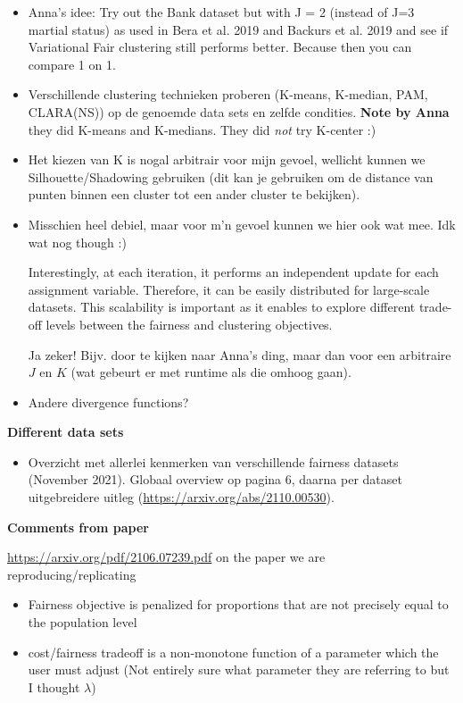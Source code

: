 \documentclass{article}
\begin{document}
\begin{itemize}
    \item Anna's idee: Try out the Bank dataset but with J = 2 (instead of J=3 martial status) as used in Bera et al. 2019 and Backurs et al. 2019 and see if Variational Fair clustering still performs better. Because then you can compare 1 on 1.
    \item Verschillende clustering technieken proberen (K-means, K-median, PAM, CLARA(NS)) op de genoemde data sets en zelfde condities. \textbf{Note by Anna} they did K-means and K-medians. They did \textit{not} try K-center :) 
    \item Het kiezen van K is nogal arbitrair voor mijn gevoel, wellicht kunnen we Silhouette/Shadowing gebruiken (dit kan je gebruiken om de distance van punten binnen een cluster tot een ander cluster te bekijken).
    \item Misschien heel debiel, maar voor m'n gevoel kunnen we hier ook wat mee. Idk wat nog though :)
    
    Interestingly, at each iteration, it performs an independent update for each assignment variable. Therefore, it can be easily distributed for large-scale datasets. This scalability is important as it enables to explore different trade-off levels between the fairness and clustering objectives.
    
    Ja zeker! Bijv. door te kijken naar Anna's ding, maar dan voor een arbitraire $J$ en $K$ (wat gebeurt er met runtime als die omhoog gaan). 
    
    \item Andere divergence functions?

\end{itemize}

\textbf{Different data sets}

\begin{itemize}
    \item Overzicht met allerlei kenmerken van verschillende fairness datasets (November 2021). Globaal overview op pagina 6, daarna per dataset uitgebreidere uitleg (\url{https://arxiv.org/abs/2110.00530}).
\end{itemize}


\textbf{Comments from paper}

\url{https://arxiv.org/pdf/2106.07239.pdf} on the paper we are reproducing/replicating
\begin{itemize}
    \item Fairness objective is penalized for proportions that are not precisely equal to the population level 
    \item cost/fairness tradeoff is a non-monotone function of a parameter which the user must adjust (Not entirely sure what parameter they are referring to but I thought $\lambda$) 
\end{itemize}
\end{document}
